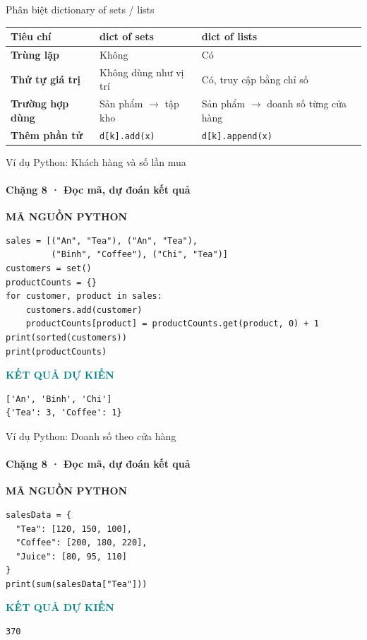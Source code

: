 \documentclass[aspectratio=169,10pt]{beamer}
\newcommand{\py}[1]{{\color{deepnavy}\texttt{#1}}}
\begin{document}
\begin{frame}[t]{Phân biệt dictionary of sets / lists}

\small
\begin{tabularx}{\linewidth}{>{\bfseries}p{3.1cm}XX}
\toprule
Tiêu chí & dict of sets & dict of lists\\\midrule
Trùng lặp & Không & Có\\\midrule
Thứ tự giá trị & Không dùng như vị trí & Có, truy cập bằng chỉ số\\\midrule
Trường hợp dùng & Sản phẩm $\to$ tập kho & Sản phẩm $\to$ doanh số từng cửa hàng\\\midrule
Thêm phần tử & \py{d[k].add(x)} & \py{d[k].append(x)}\\
\bottomrule
\end{tabularx}

\end{frame}

\begin{frame}[fragile,t]{Ví dụ Python: Khách hàng và số lần mua}
\framesubtitle{Chặng 8 · Đọc mã, dự đoán kết quả}
\vspace{-1mm}
{\small\color{muted}\textbf{MÃ NGUỒN PYTHON}}\par\vspace{1mm}
\begin{Verbatim}[fontsize=\scriptsize,frame=single,framesep=4mm,rulecolor=\color{teal!35},breaklines=true]
sales = [("An", "Tea"), ("An", "Tea"),
         ("Binh", "Coffee"), ("Chi", "Tea")]
customers = set()
productCounts = {}
for customer, product in sales:
    customers.add(customer)
    productCounts[product] = productCounts.get(product, 0) + 1
print(sorted(customers))
print(productCounts)
\end{Verbatim}
\vspace{1mm}\textcolor{teal}{\scriptsize\textbf{KẾT QUẢ DỰ KIẾN}}
\begin{Verbatim}[fontsize=\scriptsize,breaklines=true]
['An', 'Binh', 'Chi']
{'Tea': 3, 'Coffee': 1}
\end{Verbatim}

\end{frame}

\begin{frame}[fragile,t]{Ví dụ Python: Doanh số theo cửa hàng}
\framesubtitle{Chặng 8 · Đọc mã, dự đoán kết quả}
\vspace{-1mm}
{\small\color{muted}\textbf{MÃ NGUỒN PYTHON}}\par\vspace{1mm}
\begin{Verbatim}[fontsize=\scriptsize,frame=single,framesep=4mm,rulecolor=\color{teal!35},breaklines=true]
salesData = {
  "Tea": [120, 150, 100],
  "Coffee": [200, 180, 220],
  "Juice": [80, 95, 110]
}
print(sum(salesData["Tea"]))
\end{Verbatim}
\vspace{1mm}\textcolor{teal}{\scriptsize\textbf{KẾT QUẢ DỰ KIẾN}}
\begin{Verbatim}[fontsize=\scriptsize,breaklines=true]
370
\end{Verbatim}

\end{frame}
\end{document}
